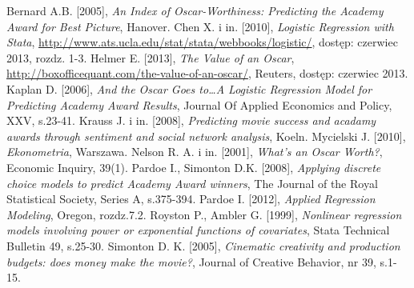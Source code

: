 \begin{thebibliography}{12}
 
	Bernard A.B. [2005], 
	\emph{An Index of Oscar-Worthiness: Predicting the Academy Award for Best Picture}, Hanover.
	Chen X. i in. [2010], 
	\emph{Logistic Regression with Stata}, \url{http://www.ats.ucla.edu/stat/stata/webbooks/logistic/}, dostęp: czerwiec 2013, rozdz. 1-3.
	Helmer E. [2013],
	\emph{The Value of an Oscar}, \url{http://boxofficequant.com/the-value-of-an-oscar/}, Reuters, dostęp: czerwiec 2013.	
	Kaplan D. [2006], 
	\emph{And the Oscar Goes to…A Logistic Regression Model for Predicting Academy Award Results}, Journal Of Applied Economics and Policy, XXV, s.23-41.
	Krauss J. i in. [2008], 
	\emph{Predicting movie success and acadamy awards through sentiment and social network analysis}, Koeln.
	Mycielski J. [2010], 
	\emph{Ekonometria}, Warszawa.
	Nelson R. A. i in. [2001], 
	\emph{What's an Oscar Worth?}, Economic Inquiry, 39(1).
 	Pardoe I., Simonton D.K. [2008], 
  	\emph{Applying discrete choice models to predict Academy Award winners}, 
  	The Journal of the Royal Statistical Society, Series A, s.375-394.
 	Pardoe I. [2012], 
 	\emph{Applied Regression Modeling}, Oregon, rozdz.7.2.
	Royston P., Ambler G. [1999],
	\emph{Nonlinear regression models involving power or exponential functions of covariates},
	Stata Technical Bulletin 49, s.25-30.
	Simonton D. K. [2005],
	\emph{Cinematic creativity and production budgets: does money make the movie?},
	Journal of Creative Behavior, nr 39, s.1-15.
 	
 	
 \end{thebibliography}